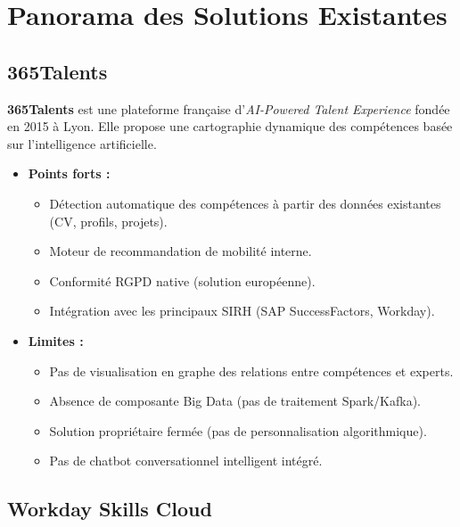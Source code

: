 \documentclass[12pt,a4paper]{article}
\begin{document}
\section{Panorama des Solutions Existantes}

\subsection{365Talents}

\textbf{365Talents} est une plateforme française d'\textit{AI-Powered Talent Experience} fondée en 2015 à Lyon. Elle propose une cartographie dynamique des compétences basée sur l'intelligence artificielle.

\begin{itemize}[leftmargin=*]
    \item \textbf{Points forts :}
    \begin{itemize}[leftmargin=*, label=--]
        \item Détection automatique des compétences à partir des données existantes (CV, profils, projets).
        \item Moteur de recommandation de mobilité interne.
        \item Conformité RGPD native (solution européenne).
        \item Intégration avec les principaux SIRH (SAP SuccessFactors, Workday).
    \end{itemize}
    \item \textbf{Limites :}
    \begin{itemize}[leftmargin=*, label=--]
        \item Pas de visualisation en graphe des relations entre compétences et experts.
        \item Absence de composante Big Data (pas de traitement Spark/Kafka).
        \item Solution propriétaire fermée (pas de personnalisation algorithmique).
        \item Pas de chatbot conversationnel intelligent intégré.
    \end{itemize}
\end{itemize}

\subsection{Workday Skills Cloud}
\end{document}
